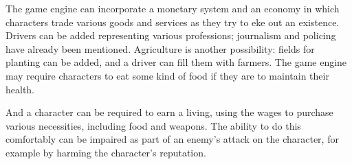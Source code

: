 The game engine can incorporate a monetary system and an economy in which
characters trade various goods and services as they try to eke out
an existence.
Drivers can be added representing various professions;
journalism and policing have already been mentioned.
Agriculture is another possibility: fields for planting can be added,
and a driver can fill them with farmers.
The game engine may require characters to eat some kind of food if they are
to maintain their health.

And a character can be required to earn a living, using the wages to
purchase various necessities, including food and weapons.
The ability to do this comfortably can be impaired as part of an enemy's attack
on the character, for example by harming the character's reputation.
